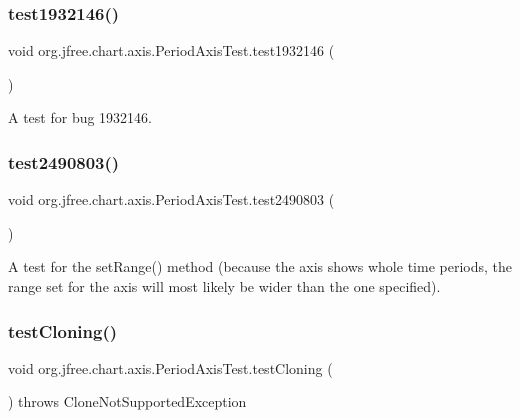 \subsubsection{\texorpdfstring{test1932146()}{test1932146()}}
{\footnotesize\ttfamily void org.\+jfree.\+chart.\+axis.\+Period\+Axis\+Test.\+test1932146 (\begin{DoxyParamCaption}{ }\end{DoxyParamCaption})}

A test for bug 1932146. \mbox{\label{classorg_1_1jfree_1_1chart_1_1axis_1_1_period_axis_test_a7fa2b02261f355362cb5b20fe534b4f2}} 
\subsubsection{\texorpdfstring{test2490803()}{test2490803()}}
{\footnotesize\ttfamily void org.\+jfree.\+chart.\+axis.\+Period\+Axis\+Test.\+test2490803 (\begin{DoxyParamCaption}{ }\end{DoxyParamCaption})}

A test for the set\+Range() method (because the axis shows whole time periods, the range set for the axis will most likely be wider than the one specified). \mbox{\label{classorg_1_1jfree_1_1chart_1_1axis_1_1_period_axis_test_af5e00b43b6ba33f735d5b3e2039d0448}} 
\subsubsection{\texorpdfstring{test\+Cloning()}{testCloning()}}
{\footnotesize\ttfamily void org.\+jfree.\+chart.\+axis.\+Period\+Axis\+Test.\+test\+Cloning (\begin{DoxyParamCaption}{ }\end{DoxyParamCaption}) throws Clone\+Not\+Supported\+Exception}

